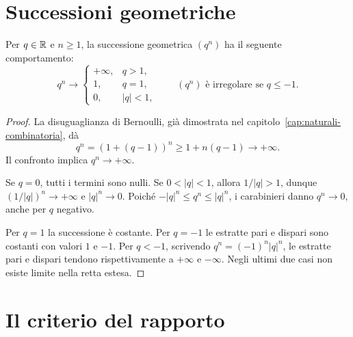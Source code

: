 \section{Successioni geometriche}
\label{sec:successioni-geometriche}

\begin{teorema}
Per $q\in\mathbb{R}$ e $n\ge1$, la successione geometrica $(q^n)$ ha il seguente comportamento:
\[
q^n\longrightarrow
\begin{cases}
+\infty,&q>1,\\
1,&q=1,\\
0,&|q|<1,
\end{cases}
\qquad
(q^n)\text{ è irregolare se }q\le-1.
\]
\end{teorema}
\begin{proof}
 La disuguaglianza di Bernoulli, già dimostrata nel capitolo~\ref{cap:naturali-combinatoria}, dà
\[
q^n=(1+(q-1))^n\ge1+n(q-1)\longrightarrow+\infty.
\]
Il confronto implica $q^n\to+\infty$.

 Se $q=0$, tutti i termini sono nulli. Se $0<|q|<1$, allora $1/|q|>1$, dunque $(1/|q|)^n\to+\infty$ e $|q|^n\to0$. Poiché $-|q|^n\le q^n\le|q|^n$, i carabinieri danno $q^n\to0$, anche per $q$ negativo.

 Per $q=1$ la successione è costante. Per $q=-1$ le estratte pari e dispari sono costanti con valori $1$ e $-1$. Per $q<-1$, scrivendo $q^n=(-1)^n|q|^n$, le estratte pari e dispari tendono rispettivamente a $+\infty$ e $-\infty$. Negli ultimi due casi non esiste limite nella retta estesa.
\end{proof}

\section{Il criterio del rapporto}

